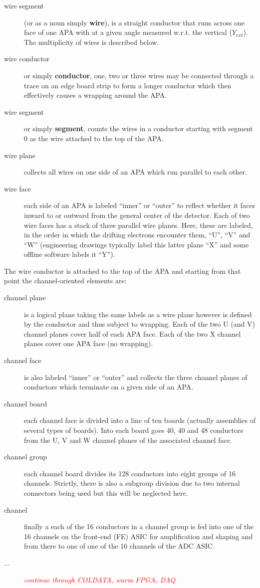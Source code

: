 \documentclass[letterpaper,twoside,onecolumn,article]{memoir}
\newcommand{\fixme}[1]{\textcolor{red}{\textit{#1}}}
\begin{document}
\begin{description}
\item[wire segment] (or as a noun simply \textbf{wire}), is a straight
  conductor that runs across one face of one APA with at a given angle
  measured w.r.t. the vertical ($Y_{ext}$).  The multiplicity of wires
  is described below.
\item[wire conductor] or simply \textbf{conductor}, one, two or three
  wires may be connected through a trace on an edge board strip to
  form a longer conductor which then effectively causes a wrapping
  around the APA.
\item[wire segment] or simply \textbf{segment}, counts the wires in a
  conductor starting with segment 0 as the wire attached to the top of
  the APA.
\item[wire plane] collects all wires on one side of an APA which run
  parallel to each other.
\item[wire face] each side of an APA is labeled ``inner'' or ``outer''
  to reflect whether it faces inward to or outward from the general
  center of the detector.  Each of two wire faces has a stack of three
  parallel wire planes.  Here, these are labeled, in the order in
  which the drifting electrons encounter them, ``U'', ``V'' and ``W''
  (engineering drawings typically label this latter plane ``X'' and
  some offline software labels it ``Y'').
\end{description}

The wire conductor is attached to the top of the APA and starting from
that point the channel-oriented elements are:

\begin{description}
\item[channel plane] is a logical plane taking the same labels as a
  wire plane however is defined by the conductor and thus subject to
  wrapping.  Each of the two U (and V) channel planes cover half of
  each APA face.  Each of the two X channel planes cover one APA face
  (no wrapping).
\item[channel face] is also labeled ``inner'' or ``outer'' and
  collects the three channel planes of conductors which terminate on a
  given side of an APA.
\item[channel board] each channel face is divided into a line of ten
  boards (actually assemblies of several types of boards).  Into each
  board goes 40, 40 and 48 conductors from the U, V and W channel
  planes of the associated channel face.
\item[channel group] each channel board divides its 128 conductors
  into eight groups of 16 channels.  Strictly, there is also a
  subgroup division due to two internal connectors being used but this
  will be neglected here.
\item[channel] finally a each of the 16 conductors in a channel group
  is fed into one of the 16 channels on the front-end (FE) ASIC for
  amplification and shaping and from there to one of one of the 16
  channels of the ADC ASIC.
\item[...] \fixme{continue through COLDATA, warm FPGA, DAQ}
\end{description}
\end{document}
